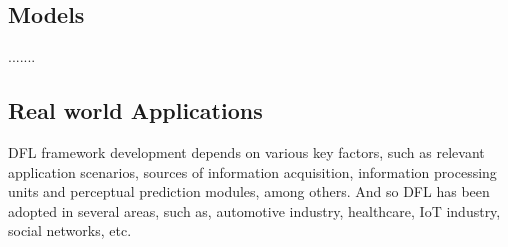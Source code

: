\subsection{Models}
\label{sub:models}

.......

\subsection{Real world Applications}
\label{sub:real_world_applications}

DFL framework development depends on various key factors, such as relevant application scenarios, sources of information acquisition, information processing units and perceptual prediction modules, among others. And so DFL has been adopted in several areas, such as, automotive industry, healthcare, IoT industry, social networks, etc.

